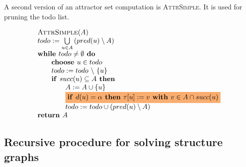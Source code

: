 \documentclass{article}
\newcommand{\If}{\text{\textbf{if }}}
\newcommand{\Do}{\text{\textbf{ do }}}
\newcommand{\Then}{\text{\textbf{ then }}}
\newcommand{\While}{\text{\textbf{while }}}
\newcommand{\Choose}{\text{\textbf{choose }}}
\newcommand{\Return}{\text{\textbf{return }}}
\newcommand{\With}{\text{\textbf{ with }}}
\begin{document}
A second version of an attractor set computation is \textsc{AttrSimple}. It is used for pruning the todo list.

\begin{equation*}
\begin{array}{l}
\textsc{AttrSimple}(A) \\ 
todo:=\bigcup\limits_{u\in A}\left( pred(u)\setminus A\right)  \\ 
\While todo \neq \emptyset \Do \\ 
\qquad \Choose u \in todo \\ 
\qquad todo:=todo\ \backslash \ \{u\} \\ 
\qquad \If succ(u)\subseteq A \Then \\ 
\qquad \qquad A:=A\cup \{u\} \\ 
\qquad \qquad \colorbox{Apricot}{$ \If d(u) = \alpha \Then \tau
\lbrack u]:=v\With v\in A\cap succ(u) $}\\ 
\qquad \qquad todo:=todo\cup \left( pred(u)\setminus A\right)  \\ 
\Return A
\end{array}
\end{equation*}

\subsection{Recursive procedure for solving structure graphs}
\end{document}
